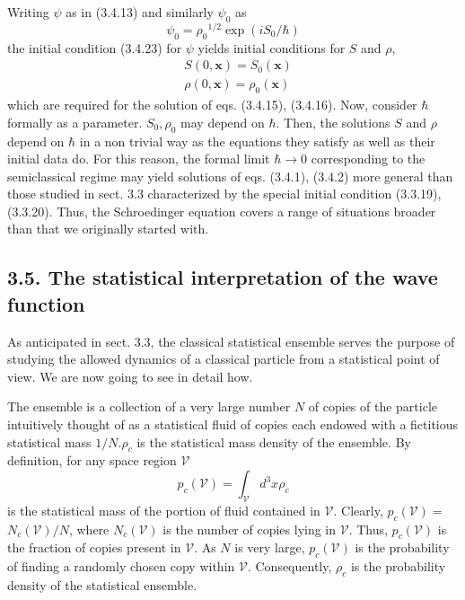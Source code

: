 \documentclass{article}
\begin{document}
Writing $\psi$ as in (3.4.13) and similarly $\psi_{0}$ as
$$
\begin{equation*}
\psi_{0}=\rho_{0}{ }^{1 / 2} \exp \left(i S_{0} / \hbar\right) \tag{3.4.25}
\end{equation*}
$$
the initial condition (3.4.23) for $\psi$ yields initial conditions for $S$ and $\rho$,
$$
\begin{align*}
& S(0, \boldsymbol{x})=S_{0}(\boldsymbol{x})  \tag{3.4.26}\\
& \rho(0, \boldsymbol{x})=\rho_{0}(\boldsymbol{x}) \tag{3.4.27}
\end{align*}
$$
which are required for the solution of eqs. (3.4.15), (3.4.16). Now, consider $\hbar$ formally as a parameter. $S_{0}, \rho_{0}$ may depend on $\hbar$. Then, the solutions $S$ and $\rho$ depend on $\hbar$ in a non trivial way as the equations they satisfy as well as their initial data do. For this reason, the formal limit $\hbar \rightarrow 0$ corresponding to the semiclassical regime may yield solutions of eqs. (3.4.1), (3.4.2) more general than those studied in sect. 3.3 characterized by the special initial condition (3.3.19), (3.3.20). Thus, the Schroedinger equation covers a range of situations broader than that we originally started with.

\subsection*{3.5. The statistical interpretation of the wave function}

As anticipated in sect. 3.3, the classical statistical ensemble serves the purpose of studying the allowed dynamics of a classical particle from a statistical point of view. We are now going to see in detail how.

The ensemble is a collection of a very large number $N$ of copies of the particle intuitively thought of as a statistical fluid of copies each endowed with a fictitious statistical mass $1 / N . \rho_{c}$ is the statistical mass density of the ensemble. By definition, for any space region $\mathcal{V}$
$$
\begin{equation*}
p_{c}(\mathcal{V})=\int_{\mathcal{V}} d^{3} x \rho_{c} \tag{3.5.1}
\end{equation*}
$$
is the statistical mass of the portion of fluid contained in $\mathcal{V}$. Clearly, $p_{c}(\mathcal{V})=$ $N_{c}(\mathcal{V}) / N$, where $N_{c}(\mathcal{V})$ is the number of copies lying in $\mathcal{V}$. Thus, $p_{c}(\mathcal{V})$ is the fraction of copies present in $\mathcal{V}$. As $N$ is very large,
$p_{c}(\mathcal{V})$ is the probability of finding a randomly chosen copy within $\mathcal{V}$. Consequently, $\rho_{c}$ is the probability density of the statistical ensemble.
\end{document}
